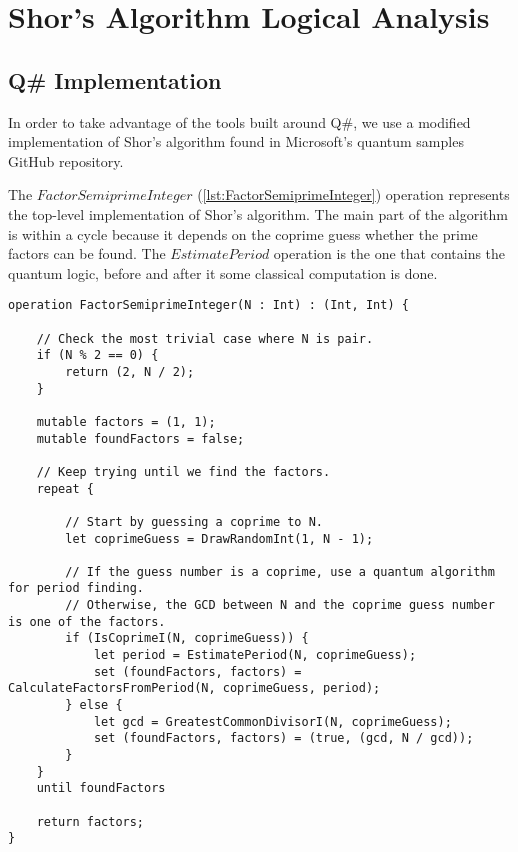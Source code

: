 %
%
\chapter {Shor's Algorithm Logical Analysis}

\section{Q\# Implementation}

In order to take advantage of the tools built around Q\#, we use a modified implementation of Shor's algorithm found in Microsoft's quantum samples GitHub repository\cite{MicrosoftQDKSamples}.

The $FactorSemiprimeInteger$ (\ref{lst:FactorSemiprimeInteger}) operation represents the top-level implementation of Shor's algorithm. The main part of the algorithm is within a cycle because it depends on the coprime guess whether the prime factors can be found. The $EstimatePeriod$ operation is the one that contains the quantum logic, before and after it some classical computation is done.

\begin{lstlisting}[language=qsharp,label=lst:FactorSemiprimeInteger,caption={Top level implementation of Shor's algorithm in Q\#}]
operation FactorSemiprimeInteger(N : Int) : (Int, Int) {

    // Check the most trivial case where N is pair.
    if (N % 2 == 0) {
        return (2, N / 2);
    }

    mutable factors = (1, 1);
    mutable foundFactors = false;

    // Keep trying until we find the factors.
    repeat {

        // Start by guessing a coprime to N.
        let coprimeGuess = DrawRandomInt(1, N - 1);

        // If the guess number is a coprime, use a quantum algorithm for period finding.
        // Otherwise, the GCD between N and the coprime guess number is one of the factors.
        if (IsCoprimeI(N, coprimeGuess)) {
            let period = EstimatePeriod(N, coprimeGuess);
            set (foundFactors, factors) = CalculateFactorsFromPeriod(N, coprimeGuess, period);
        } else {
            let gcd = GreatestCommonDivisorI(N, coprimeGuess);
            set (foundFactors, factors) = (true, (gcd, N / gcd));
        }
    }
    until foundFactors

    return factors;
}
\end{lstlisting}

